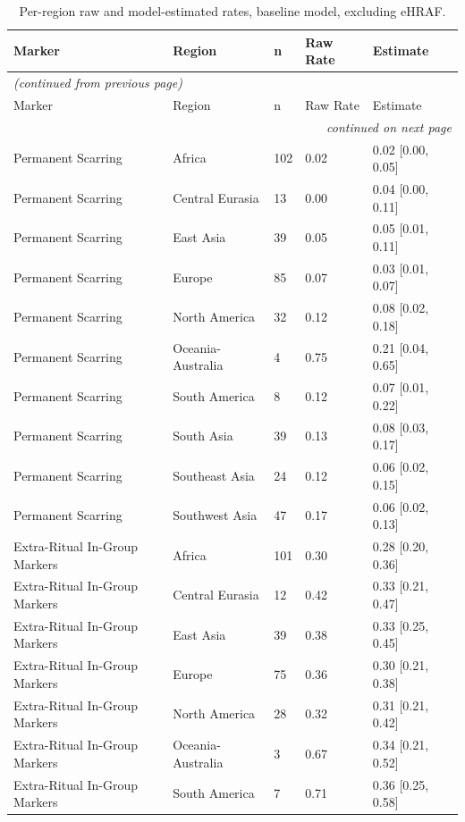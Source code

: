 \small
\begin{longtable}{lllll}
\caption{Per-region raw and model-estimated rates, baseline model, excluding eHRAF.} \label{tab:extnoehraf_region_effects_baseline} \\
\toprule
Marker & Region & n & Raw Rate & Estimate \\
\midrule
\endfirsthead
\multicolumn{5}{l}{\small\itshape (continued from previous page)} \\
\toprule
Marker & Region & n & Raw Rate & Estimate \\
\midrule
\endhead
\midrule
\multicolumn{5}{r}{\small\itshape continued on next page} \\
\endfoot
\bottomrule
\endlastfoot
Permanent Scarring & Africa & 102 & 0.02 & 0.02 [0.00, 0.05] \\
Permanent Scarring & Central Eurasia & 13 & 0.00 & 0.04 [0.00, 0.11] \\
Permanent Scarring & East Asia & 39 & 0.05 & 0.05 [0.01, 0.11] \\
Permanent Scarring & Europe & 85 & 0.07 & 0.03 [0.01, 0.07] \\
Permanent Scarring & North America & 32 & 0.12 & 0.08 [0.02, 0.18] \\
Permanent Scarring & Oceania-Australia & 4 & 0.75 & 0.21 [0.04, 0.65] \\
Permanent Scarring & South America & 8 & 0.12 & 0.07 [0.01, 0.22] \\
Permanent Scarring & South Asia & 39 & 0.13 & 0.08 [0.03, 0.17] \\
Permanent Scarring & Southeast Asia & 24 & 0.12 & 0.06 [0.02, 0.15] \\
Permanent Scarring & Southwest Asia & 47 & 0.17 & 0.06 [0.02, 0.13] \\
Extra-Ritual In-Group Markers & Africa & 101 & 0.30 & 0.28 [0.20, 0.36] \\
Extra-Ritual In-Group Markers & Central Eurasia & 12 & 0.42 & 0.33 [0.21, 0.47] \\
Extra-Ritual In-Group Markers & East Asia & 39 & 0.38 & 0.33 [0.25, 0.45] \\
Extra-Ritual In-Group Markers & Europe & 75 & 0.36 & 0.30 [0.21, 0.38] \\
Extra-Ritual In-Group Markers & North America & 28 & 0.32 & 0.31 [0.21, 0.42] \\
Extra-Ritual In-Group Markers & Oceania-Australia & 3 & 0.67 & 0.34 [0.21, 0.52] \\
Extra-Ritual In-Group Markers & South America & 7 & 0.71 & 0.36 [0.25, 0.58] \\

\end{longtable}
